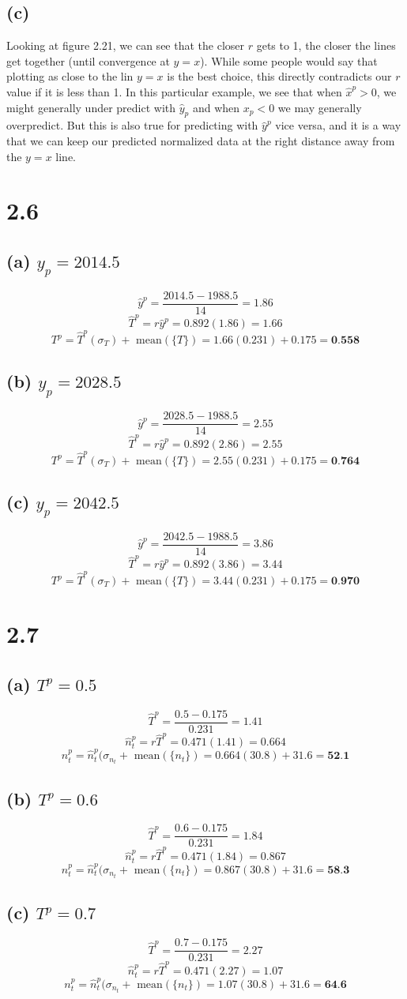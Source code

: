\documentclass[11pt]{article}
\begin{document}
\subsection*{(c)}
Looking at figure 2.21, we can see that the closer $r$ gets to 1, the closer the lines get together (until convergence at $y=x$). While some people would say that plotting as close to the lin $y=x$ is the best choice, this directly contradicts our $r$ value if it is less than 1. In this particular example, we see that when $\hat{x}^p>0$, we might generally under predict with $\hat{y}_p$ and when $x_p<0$ we may generally overpredict. But this is also true for predicting with $\hat{y}^p$ vice versa, and it is a way that we can keep our predicted normalized data at the right distance away from the $y=x$ line.
\clearpage
\section*{2.6}
\subsection*{(a) $y_p=2014.5$}
\[\hat{y}^p=\frac{2014.5-1988.5}{14}=1.86\]
\[\hat{T}^p=r\hat{y}^p=0.892(1.86)=1.66\]
\[T^p=\hat{T}^p(\sigma_T)+\text{ mean}(\{T\})=1.66(0.231)+0.175=\textbf{0.558}\]
\subsection*{(b) $y_p=2028.5$}
\[\hat{y}^p=\frac{2028.5-1988.5}{14}=2.55\]
\[\hat{T}^p=r\hat{y}^p=0.892(2.86)=2.55\]
\[T^p=\hat{T}^p(\sigma_T)+\text{ mean}(\{T\})=2.55(0.231)+0.175=\textbf{0.764}\]
\subsection*{(c) $y_p=2042.5$}
\[\hat{y}^p=\frac{2042.5-1988.5}{14}=3.86\]
\[\hat{T}^p=r\hat{y}^p=0.892(3.86)=3.44\]
\[T^p=\hat{T}^p(\sigma_T)+\text{ mean}(\{T\})=3.44(0.231)+0.175=\textbf{0.970}\]
\clearpage
\section*{2.7}
\subsection*{(a) $T^p=0.5$}
\[\hat{T}^p=\frac{0.5-0.175}{0.231}=1.41\]
\[\hat{n}_t^p=r\hat{T}^p=0.471(1.41)=0.664\]
\[n_t^p=\hat{n}_t^p(\sigma_{n_t}+\text{ mean}(\{n_t\})=0.664(30.8)+31.6=\textbf{52.1}\]
\subsection*{(b) $T^p=0.6$}
\[\hat{T}^p=\frac{0.6-0.175}{0.231}=1.84\]
\[\hat{n}_t^p=r\hat{T}^p=0.471(1.84)=0.867\]
\[n_t^p=\hat{n}_t^p(\sigma_{n_t}+\text{ mean}(\{n_t\})=0.867(30.8)+31.6=\textbf{58.3}\]
\subsection*{(c) $T^p=0.7$}
\[\hat{T}^p=\frac{0.7-0.175}{0.231}=2.27\]
\[\hat{n}_t^p=r\hat{T}^p=0.471(2.27)=1.07\]
\[n_t^p=\hat{n}_t^p(\sigma_{n_t}+\text{ mean}(\{n_t\})=1.07(30.8)+31.6=\textbf{64.6}\]
\end{document}
